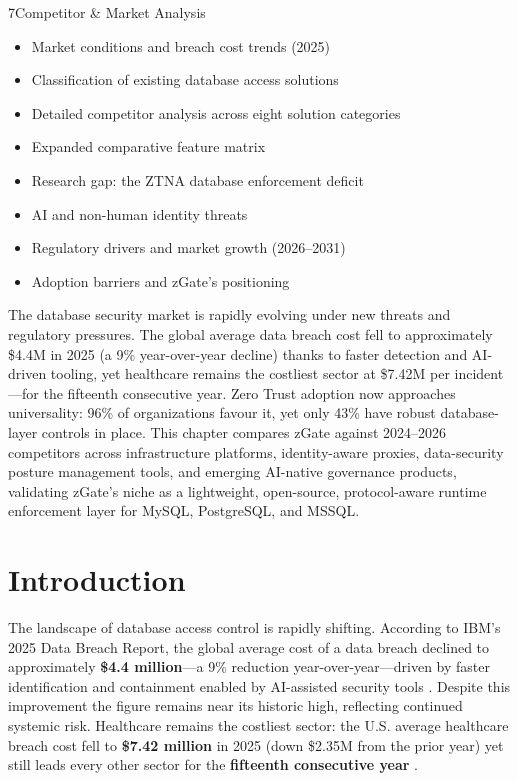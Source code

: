 
\begin{sectionintro}{7}{Competitor \& Market Analysis}{
  \begin{itemize}[leftmargin=1.5em]
    \item Market conditions and breach cost trends (2025)
    \item Classification of existing database access solutions
    \item Detailed competitor analysis across eight solution categories
    \item Expanded comparative feature matrix
    \item Research gap: the ZTNA database enforcement deficit
    \item AI and non-human identity threats
    \item Regulatory drivers and market growth (2026--2031)
    \item Adoption barriers and zGate's positioning
  \end{itemize}
}
The database security market is rapidly evolving under new threats and regulatory pressures. The global average data breach cost fell to approximately \$4.4M in 2025 (a 9\% year-over-year decline) thanks to faster detection and AI-driven tooling, yet healthcare remains the costliest sector at \$7.42M per incident---for the fifteenth consecutive year. Zero Trust adoption now approaches universality: 96\% of organizations favour it, yet only 43\% have robust database-layer controls in place. This chapter compares zGate against 2024--2026 competitors across infrastructure platforms, identity-aware proxies, data-security posture management tools, and emerging AI-native governance products, validating zGate's niche as a lightweight, open-source, protocol-aware runtime enforcement layer for MySQL, PostgreSQL, and MSSQL.
\end{sectionintro}

\section{Introduction}

The landscape of database access control is rapidly shifting. According to IBM's 2025 Data Breach Report, the global average cost of a data breach declined to approximately \textbf{\$4.4 million}---a 9\% reduction year-over-year---driven by faster identification and containment enabled by AI-assisted security tools \cite{ibm2025}. Despite this improvement the figure remains near its historic high, reflecting continued systemic risk. Healthcare remains the costliest sector: the U.S. average healthcare breach cost fell to \textbf{\$7.42 million} in 2025 (down \$2.35M from the prior year) yet still leads every other sector for the \textbf{fifteenth consecutive year} \cite{hipaajournal2025}.

